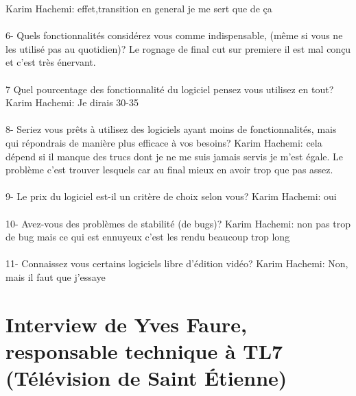 Karim Hachemi: effet,transition en general je me sert que de ça

\paragraph{}
6-  Quels fonctionnalités considérez vous comme indispensable, (même si vous
ne les utilisé pas au quotidien)?
Le rognage de final cut sur premiere il est mal conçu et c'est très
énervant.

\paragraph{}
7 Quel pourcentage des fonctionnalité du logiciel pensez vous utilisez
en tout?
Karim Hachemi: Je dirais 30-35%

\paragraph{}
8- Seriez vous prêts à utilisez des logiciels ayant moins de fonctionnalités,
mais qui répondrais de manière plus efficace à vos besoins?
Karim Hachemi: cela dépend si il manque des trucs dont je ne me
suis jamais servis je m'est égale. Le problème c'est
trouver lesquels car au final mieux en avoir trop que pas assez.

\paragraph{}
9-  Le prix du logiciel est-il un critère de choix selon vous?
Karim Hachemi: oui

\paragraph{}
10- Avez-vous des problèmes de stabilité (de bugs)?
Karim Hachemi: non pas trop de bug mais ce qui est ennuyeux c'est les
rendu beaucoup trop long

\paragraph{}
11- Connaissez vous certains logiciels libre d'édition vidéo?
Karim Hachemi: Non, mais il faut que j'essaye

\section*{Interview de Yves Faure,  responsable technique à TL7
(Télévision de Saint Étienne)}

